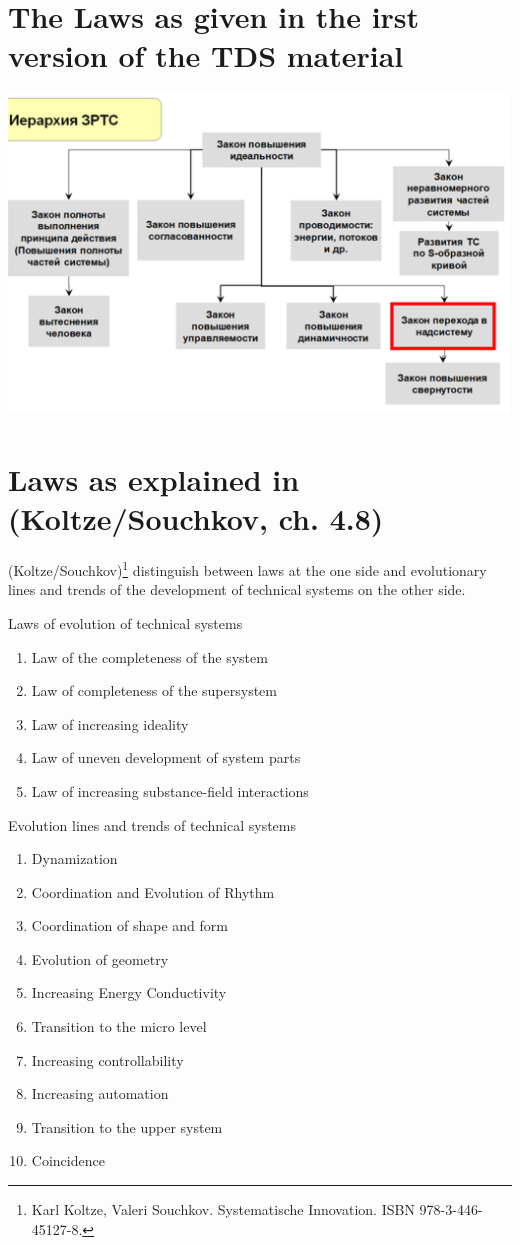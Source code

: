 \documentclass[11pt,a4paper]{article}
\begin{document}
\section*{The Laws as given in the irst version of the TDS material}

\begin{center}
  \includegraphics[width=.9\textwidth]{oE4yUs.png}
\end{center}

\section*{Laws as explained in (Koltze/Souchkov, ch. 4.8)}

(Koltze/Souchkov)\footnote{ Karl Koltze, Valeri Souchkov. Systematische
  Innovation. ISBN 978-3-446-45127-8.  } distinguish between laws at the one
side and evolutionary lines and trends of the development of technical systems
on the other side.

Laws of evolution of technical systems
\begin{enumerate}\itemsep0pt
\item Law of the completeness of the system
\item Law of completeness of the supersystem
\item Law of increasing ideality
\item Law of uneven development of system parts
\item Law of increasing substance-field interactions
\end{enumerate}

Evolution lines and trends of technical systems
\begin{enumerate}\itemsep0pt
\item Dynamization
\item Coordination and Evolution of Rhythm
\item Coordination of shape and form
\item Evolution of geometry
\item Increasing Energy Conductivity
\item Transition to the micro level
\item Increasing controllability
\item Increasing automation
\item Transition to the upper system
\item Coincidence
\end{enumerate}
\end{document}
